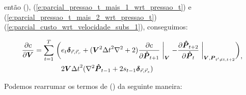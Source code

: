   \DIFdelbegin {}\DIFdelend \DIFaddbegin {}\DIFaddend então (\DIFdelbegin \DIFdel{\ref{e:parcial_custo_wrt_pressao_t_em_v}}\DIFdelend \DIFaddbegin \DIFadd{\ref{e:parcial_custo_wrt_pressao_t_em_v_e_t}}\DIFaddend ), (\ref{e:parcial_pressao_t_mais_1_wrt_pressao_t}) e (\ref{e:parcial_pressao_t_mais_2_wrt_pressao_t}) \DIFdelbegin {}\DIFdelend \DIFaddbegin {}\DIFaddend (\ref{e:parcial_custo_wrt_velocidade_subs_1}), conseguimos:

  \begin{equation} \label{e:parcial_custo_wrt_velocidade_subs_2}
    \begin{split}
      \frac{\partial c}{\partial \boldsymbol{V}} = 
      \sum \limits_{t=1}^T \biggm( &
        e_t \boldsymbol{\delta}_{\vec{r}, \vec{r}_r}
        + (\boldsymbol{V}^2 {\Delta t}^2 \nabla^2 + 2) \frac{\partial c}{\partial \boldsymbol{\hat{P}}_{t+1}} \biggm\lvert_{\boldsymbol{V}}
        - \frac{\partial \boldsymbol{\hat{P}}_{t+2}}{\partial \boldsymbol{\hat{P}}_{t}} \biggm\lvert_{\boldsymbol{V}, \boldsymbol{P}_{t'\ne t, t+2}}
      \biggm) \\
      & 2 \boldsymbol{V} {\Delta t}^2 (\nabla^2 \boldsymbol{\hat{P}}_{t-1} + 2 s_{t-1} \boldsymbol{\delta}_{\vec{r}, \vec{r}_s})
    \end{split}
    ,
  \end{equation}

  Podemos rearrumar os termos de (\DIFdelbegin \DIFdel{\ref{e:parcial_custo_wrt_velocidade_subs_1}}\DIFdelend \DIFaddbegin \DIFadd{\ref{e:parcial_custo_wrt_velocidade_subs_2}}\DIFaddend ) da seguinte maneira:


